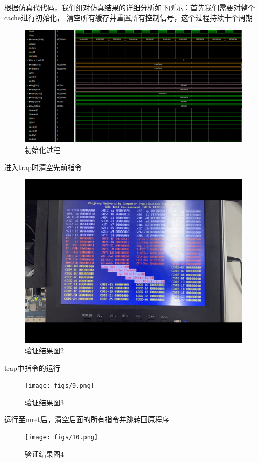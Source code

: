 根据仿真代代码，我们组对仿真结果的详细分析如下所示：首先我们需要对整个cache进行初始化，
清空所有缓存并重置所有控制信号，这个过程持续十个周期
\begin{figure}[H] %
	\centering %
	\includegraphics[width=1.0\textwidth]{figs/res1.png} %
	\caption{初始化过程} %
	\label{Fig.2} %
\end{figure}
进入trap时清空先前指令
\begin{figure}[H] %
	\centering %
	\includegraphics[width=1.0\textwidth]{figs/8.png} %
	\caption{验证结果图2} %
	\label{Fig.18} %
\end{figure}
trap中指令的运行
\begin{figure}[H] %
	\centering %
	\texttt{[image: figs/9.png]} %
	\caption{验证结果图3} %
	\label{Fig.19} %
\end{figure}
运行至mret后，清空后面的所有指令并跳转回原程序
\begin{figure}[H] %
	\centering %
	\texttt{[image: figs/10.png]} %
	\caption{验证结果图4} %
	\label{Fig.20} %
\end{figure}